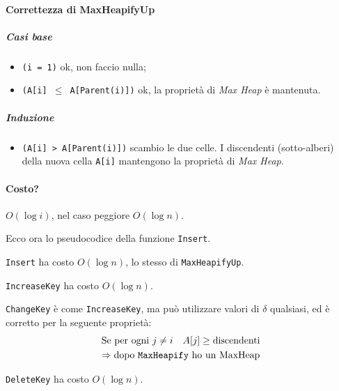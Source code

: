 \paragraph{Correttezza di MaxHeapifyUp}
\subparagraph{Casi base} 
\begin{itemize}
	\item[] \texttt{(i = 1)} ok, non faccio nulla;
	\item[] \texttt{(A[i] $\leq$ A[Parent(i)])} ok, la proprietà di \emph{Max Heap} è mantenuta.
\end{itemize}
\subparagraph{Induzione}
\begin{itemize}
	\item[] \texttt{(A[i] > A[Parent(i)])} scambio le due celle. I discendenti (sotto-alberi) della nuova
	cella \texttt{A[i]} mantengono la proprietà di \emph{Max Heap}.
\end{itemize}

\paragraph{Costo?} $O(\log i)$, nel caso peggiore $O(\log n)$.
\bigskip

Ecco ora lo pseudocodice della funzione \texttt{Insert}.

\texttt{Insert} ha costo $O(\log n)$, lo stesso di \texttt{MaxHeapifyUp}.


\texttt{IncreaseKey} ha costo $O(\log n)$.

 
\texttt{ChangeKey} è come \texttt{IncreaseKey}, ma può utilizzare valori di $\delta$ qualsiasi, ed è
corretto per la seguente proprietà:
\begin{gather*}
	\text{Se per ogni } j \neq i \quad A[j] \geq \text{discendenti} \\
	\Rightarrow \text{dopo \texttt{MaxHeapify} ho un \emph{MaxHeap}}
\end{gather*}


\texttt{DeleteKey} ha costo $O(\log n)$.
